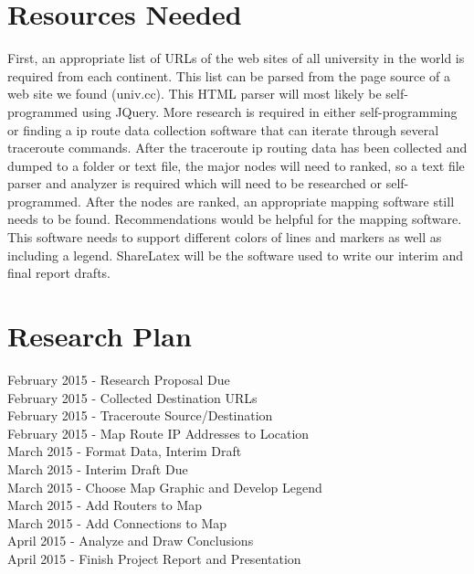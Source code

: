 \documentclass{sigcomm-alternate}
\begin{document}
\section{Resources Needed}

First, an appropriate list of URLs of the web sites of all university in the world is required from each continent. This list can be parsed from the page source of a web site we found (univ.cc). This HTML parser will most likely be self-programmed using JQuery. More research is required in either self-programming or finding a ip route data collection software that can iterate through several traceroute commands. After the traceroute ip routing data has been collected and dumped to a folder  or text file, the major nodes will need to ranked, so a text file parser and analyzer is required which will need to be researched or self-programmed. After the nodes are ranked, an appropriate mapping software still needs to be found. Recommendations would be helpful for the mapping software. This software needs to support different colors of lines and markers as well as including a legend. ShareLatex will be the software used to write our interim and final report drafts.


\section{Research Plan}
\indent
{} February 2015 - Research Proposal Due \\
 February 2015 - Collected Destination URLs \\
 February 2015 - Traceroute Source/Destination \\
 February 2015 - Map Route IP Addresses to Location\\ 
 March 2015 - Format Data, Interim Draft \\
 March 2015 - Interim Draft Due \\
 March 2015 - Choose Map Graphic and Develop Legend \\
 March 2015 - Add Routers to Map \\
 March 2015 - Add Connections to Map \\
 April 2015 - Analyze and Draw Conclusions\\ 
 April 2015 - Finish Project Report and Presentation\\
\end{document}
